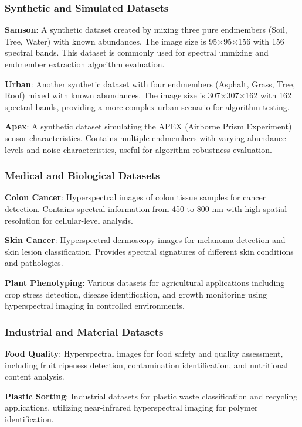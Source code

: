 \documentclass[journal]{IEEEtran}
\begin{document}
\subsubsection{Synthetic and Simulated Datasets}

\textbf{Samson}: A synthetic dataset created by mixing three pure endmembers (Soil, Tree, Water) with known abundances. The image size is 95$\times$95$\times$156 with 156 spectral bands. This dataset is commonly used for spectral unmixing and endmember extraction algorithm evaluation.

\textbf{Urban}: Another synthetic dataset with four endmembers (Asphalt, Grass, Tree, Roof) mixed with known abundances. The image size is 307$\times$307$\times$162 with 162 spectral bands, providing a more complex urban scenario for algorithm testing.

\textbf{Apex}: A synthetic dataset simulating the APEX (Airborne Prism Experiment) sensor characteristics. Contains multiple endmembers with varying abundance levels and noise characteristics, useful for algorithm robustness evaluation.

\subsubsection{Medical and Biological Datasets}

\textbf{Colon Cancer}: Hyperspectral images of colon tissue samples for cancer detection. Contains spectral information from 450 to 800 nm with high spatial resolution for cellular-level analysis.

\textbf{Skin Cancer}: Hyperspectral dermoscopy images for melanoma detection and skin lesion classification. Provides spectral signatures of different skin conditions and pathologies.

\textbf{Plant Phenotyping}: Various datasets for agricultural applications including crop stress detection, disease identification, and growth monitoring using hyperspectral imaging in controlled environments.

\subsubsection{Industrial and Material Datasets}

\textbf{Food Quality}: Hyperspectral images for food safety and quality assessment, including fruit ripeness detection, contamination identification, and nutritional content analysis.

\textbf{Plastic Sorting}: Industrial datasets for plastic waste classification and recycling applications, utilizing near-infrared hyperspectral imaging for polymer identification.
\end{document}
